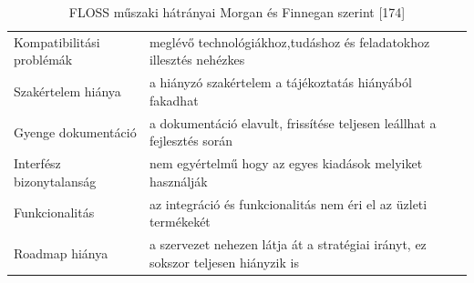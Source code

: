 \documentclass[12pt,magyar,a4paper,oneside]{scrreprt}
\begin{document}
\begin{longtable}[]{@{}ll@{}}
\caption{FLOSS műszaki hátrányai Morgan és Finnegan szerint
{[}174{]}}\tabularnewline
\toprule
\endhead
\begin{minipage}[t]{0.26\columnwidth}\raggedright
Kompatibilitási problémák\strut
\end{minipage} & \begin{minipage}[t]{0.68\columnwidth}\raggedright
meglévő technológiákhoz,tudáshoz és feladatokhoz illesztés
nehézkes\strut
\end{minipage}\tabularnewline
\begin{minipage}[t]{0.26\columnwidth}\raggedright
Szakértelem hiánya\strut
\end{minipage} & \begin{minipage}[t]{0.68\columnwidth}\raggedright
a hiányzó szakértelem a tájékoztatás hiányából fakadhat\strut
\end{minipage}\tabularnewline
\begin{minipage}[t]{0.26\columnwidth}\raggedright
Gyenge dokumentáció\strut
\end{minipage} & \begin{minipage}[t]{0.68\columnwidth}\raggedright
a dokumentáció elavult, frissítése teljesen leállhat a fejlesztés
során\strut
\end{minipage}\tabularnewline
\begin{minipage}[t]{0.26\columnwidth}\raggedright
Interfész bizonytalanság\strut
\end{minipage} & \begin{minipage}[t]{0.68\columnwidth}\raggedright
nem egyértelmű hogy az egyes kiadások melyiket használják\strut
\end{minipage}\tabularnewline
\begin{minipage}[t]{0.26\columnwidth}\raggedright
Funkcionalitás\strut
\end{minipage} & \begin{minipage}[t]{0.68\columnwidth}\raggedright
az integráció és funkcionalitás nem éri el az üzleti termékekét\strut
\end{minipage}\tabularnewline
\begin{minipage}[t]{0.26\columnwidth}\raggedright
Roadmap hiánya\strut
\end{minipage} & \begin{minipage}[t]{0.68\columnwidth}\raggedright
a szervezet nehezen látja át a stratégiai irányt, ez sokszor teljesen
hiányzik is\strut
\end{minipage}\tabularnewline
\bottomrule
\end{longtable}
\end{document}
